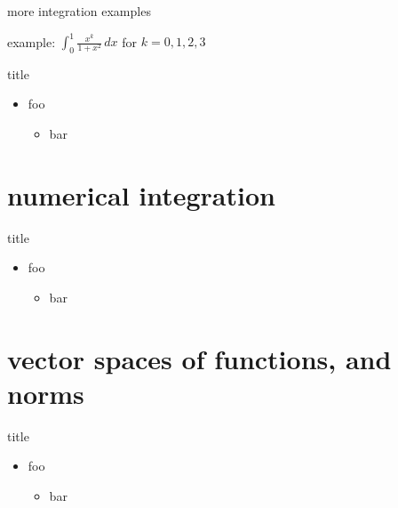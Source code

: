 \documentclass[10pt,
               svgnames,
               hyperref={colorlinks,citecolor=DeepPink4,linkcolor=FireBrick,urlcolor=Maroon},
               usepdftitle=false]{beamer}
\begin{document}
\begin{frame}{more integration examples}

example: $\displaystyle \int_0^1 \frac{x^k}{1+x^2}\,dx$ for $k=0,1,2,3$

\vspace{60mm}
\end{frame}


\AtBeginSection[] {
    \begin{frame}{Outline}
    \setbeamertemplate{section in toc}[sections numbered]
    \tableofcontents[currentsection]%
    \end{frame}
}


\begin{frame}{title}

\begin{itemize}
\item foo
   \begin{itemize}
   \item[$\circ$] bar
   \end{itemize}
\end{itemize}
\end{frame}


\section{numerical integration}

\begin{frame}{title}

\begin{itemize}
\item foo
   \begin{itemize}
   \item[$\circ$] bar
   \end{itemize}
\end{itemize}
\end{frame}


\section{vector spaces of functions, and norms}

\begin{frame}{title}

\begin{itemize}
\item foo
   \begin{itemize}
   \item[$\circ$] bar
   \end{itemize}
\end{itemize}
\end{frame}
\end{document}
